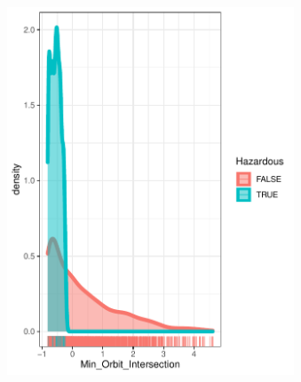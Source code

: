 \documentclass{beamer}
\begin{document}
\begin{frame}
\begin{columns}  

    \begin{figure}[b]{\textwidth}
    \centering
    \includegraphics[width=\textwidth]{Pic/DENSITY_Min_orbit_intersection.pdf}
    \vspace{4ex}
  \end{figure}
  \begin{figure}[b]{\textwidth}
    \centering

\end{figure}
\end{columns}
\end{frame}
\end{document}
